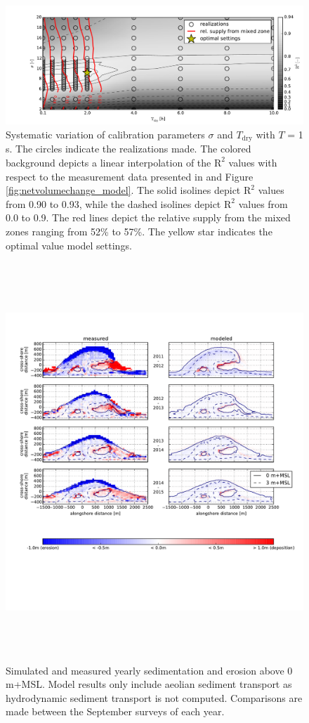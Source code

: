 \documentclass[preprint,12pt,authoryear]{elsarticle}
\begin{document}
\begin{figure}
  \centering
  \includegraphics[width=\columnwidth]{../Figures/calibration}
  \caption{Systematic variation of calibration parameters $\sigma$ and
    $T_{\mathrm{dry}}$ with $T$ = 1 s. The circles indicate the
    realizations made. The colored background depicts a linear
    interpolation of the $\mathrm{R^2}$ values with respect to the
    measurement data presented in \citet{Hoonhout2017a} and Figure
    \ref{fig:netvolumechange_model}. The solid isolines depict
    $\mathrm{R}^2$ values from 0.90 to 0.93, while the dashed isolines
    depict $\mathrm{R}^2$ values from 0.0 to 0.9. The red lines depict
    the relative supply from the mixed zones ranging from 52\% to
    57\%. The yellow star indicates the optimal value model settings.}
  \label{fig:calibration}
\end{figure}

\begin{figure}
  \centering
  \includegraphics[height=15cm, angle=90]{../Figures/model_sedero}
  \caption{Simulated and measured yearly sedimentation and erosion
    above 0 m+MSL. Model results only include aeolian sediment
    transport as hydrodynamic sediment transport is not
    computed. Comparisons are made between the September surveys of
    each year.}
  \label{fig:sedero_model}
\end{figure}
\end{document}
